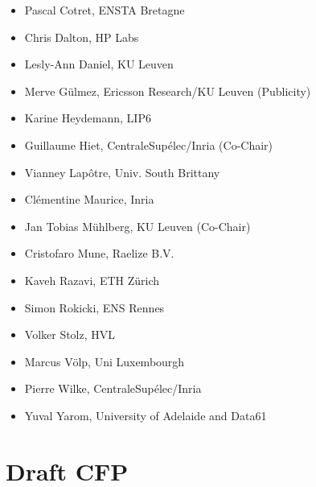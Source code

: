 \documentclass[a4paper,11pt]{article}
\begin{document}
\begin{itemize}
    \item Pascal Cotret, ENSTA Bretagne
    \item Chris Dalton, HP Labs
    \item{Lesly-Ann Daniel, KU Leuven}
    \item{Merve G\"ulmez, Ericsson Research/KU Leuven (Publicity)}
    \item Karine Heydemann, LIP6
    \item Guillaume Hiet, CentraleSupélec/Inria (Co-Chair)
    \item Vianney Lap\^otre, Univ. South Brittany
    \item{Cl\'ementine Maurice, Inria}
    \item Jan Tobias M\"uhlberg, KU Leuven (Co-Chair)
    \item Cristofaro Mune, Raelize B.V.
    \item Kaveh Razavi,  ETH Z\"urich 
    \item Simon Rokicki, ENS Rennes
    \item Volker Stolz, HVL
    \item{Marcus V\"olp, Uni Luxembourgh}
    \item Pierre Wilke, CentraleSup\'elec/Inria
    \item Yuval Yarom, University of Adelaide and Data61
\end{itemize}


\section{Draft CFP}
%

\end{document}
